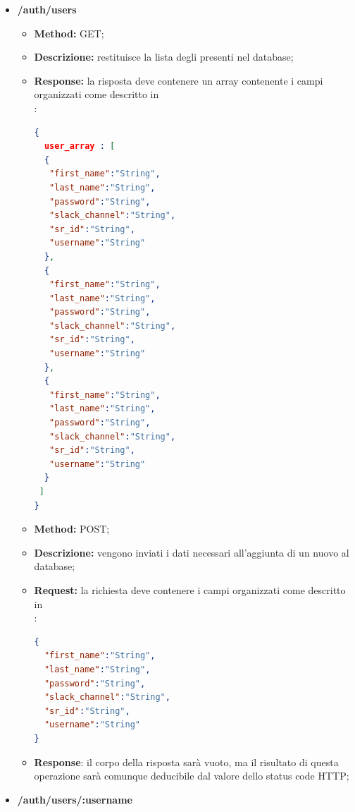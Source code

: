 \begin{itemize}
\item \textbf{/auth/users}\\
\begin{itemize}
\item \textbf{Method:} GET;
\item \textbf{Descrizione:} restituisce la lista degli  presenti nel database;
\item \textbf{Response:} la risposta deve contenere un array contenente i campi organizzati come descritto in \\:
\begin{lstlisting}[language=json,firstnumber=1]
{
  user_array : [
  {
   "first_name":"String",
   "last_name":"String",
   "password":"String",
   "slack_channel":"String",
   "sr_id":"String",
   "username":"String"
  },
  {
   "first_name":"String",
   "last_name":"String",
   "password":"String",
   "slack_channel":"String",
   "sr_id":"String",
   "username":"String"
  },
  {
   "first_name":"String",
   "last_name":"String",
   "password":"String",
   "slack_channel":"String",
   "sr_id":"String",
   "username":"String"
  }
 ]
}
\end{lstlisting}
\end{itemize}

\begin{itemize}
\item \textbf{Method:} POST;
\item \textbf{Descrizione:} vengono inviati i dati necessari all'aggiunta di un nuovo  al database;
\item \textbf{Request:} la richiesta deve contenere i campi organizzati come descritto in\\ :
\begin{lstlisting}[language=json,firstnumber=1]
{
  "first_name":"String",
  "last_name":"String",
  "password":"String",
  "slack_channel":"String",
  "sr_id":"String",
  "username":"String"
}
\end{lstlisting}
\item \textbf{Response}: il corpo della risposta sarà vuoto, ma il risultato di questa operazione sarà comunque deducibile dal valore dello status code HTTP;
\end{itemize}

\item \textbf{/auth/users/:username}\\


\end{itemize}
